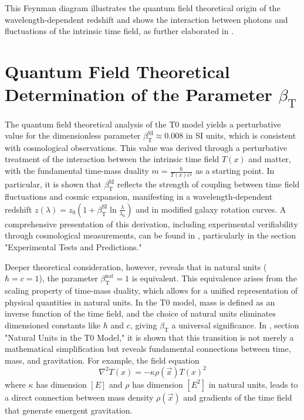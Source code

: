 \documentclass[12pt,a4paper]{article}
\newcommand{\Tfield}{T(x)}
\newcommand{\betaT}{\beta_{\text{T}}}
\newcommand{\vecx}{\vec{x}}
\begin{document}
	This Feynman diagram illustrates the quantum field theoretical origin of the wavelength-dependent redshift and shows the interaction between photons and fluctuations of the intrinsic time field, as further elaborated in \cite{pascher_feldtheorie_2025}.
	
	\section{Quantum Field Theoretical Determination of the Parameter \(\betaT\)}
	\label{sec:quantum_theoretical}
	
	The quantum field theoretical analysis of the T0 model yields a perturbative value for the dimensionless parameter \(\betaT^{\text{SI}} \approx 0.008\) in SI units, which is consistent with cosmological observations. This value was derived through a perturbative treatment of the interaction between the intrinsic time field \(\Tfield\) and matter, with the fundamental time-mass duality \(m = \frac{\hbar}{\Tfield c^2}\) as a starting point. In particular, it is shown that \(\betaT^{\text{SI}}\) reflects the strength of coupling between time field fluctuations and cosmic expansion, manifesting in a wavelength-dependent redshift \(z(\lambda) = z_0 \left(1 + \betaT^{\text{SI}} \ln \frac{\lambda}{\lambda_0}\right)\) and in modified galaxy rotation curves. A comprehensive presentation of this derivation, including experimental verifiability through cosmological measurements, can be found in \cite{pascher_emergente_gravitation_2025}, particularly in the section "Experimental Tests and Predictions."
	
	Deeper theoretical consideration, however, reveals that in natural units (\(\hbar = c = 1\)), the parameter \(\betaT^{\text{nat}} = 1\) is equivalent. This equivalence arises from the scaling property of time-mass duality, which allows for a unified representation of physical quantities in natural units. In the T0 model, mass is defined as an inverse function of the time field, and the choice of natural units eliminates dimensioned constants like \(\hbar\) and \(c\), giving \(\betaT\) a universal significance. In \cite{pascher_emergente_gravitation_2025}, section "Natural Units in the T0 Model," it is shown that this transition is not merely a mathematical simplification but reveals fundamental connections between time, mass, and gravitation. For example, the field equation
	\begin{equation}
		\nabla^2 \Tfield = -\kappa \rho(\vecx) \Tfield^2
	\end{equation}
	where \(\kappa\) has dimension \([E]\) and \(\rho\) has dimension \([E^2]\) in natural units, leads to a direct connection between mass density \(\rho(\vecx)\) and gradients of the time field that generate emergent gravitation.
	
\end{document}
